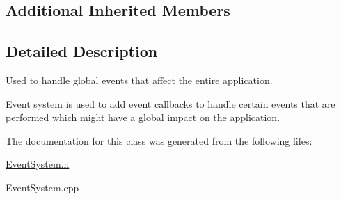 \subsection*{Additional Inherited Members}


\subsection{Detailed Description}
Used to handle global events that affect the entire application. 

Event system is used to add event callbacks to handle certain events that are performed which might have a global impact on the application. 

The documentation for this class was generated from the following files\-:\begin{DoxyCompactItemize}
\item 
\hyperlink{_event_system_8h}{Event\-System.\-h}\item 
Event\-System.\-cpp\end{DoxyCompactItemize}
